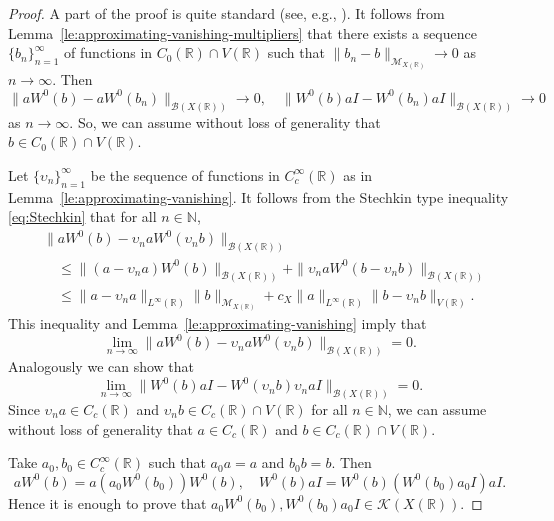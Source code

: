 \documentclass[reqno]{amsproc}
\newcommand{\cB}{\mathcal{B}}
\newcommand{\cM}{\mathcal{M}}
\newcommand{\N}{\mathbb{N}}
\newcommand{\R}{\mathbb{R}}
\theoremstyle{definition}
\theoremstyle{remark}
\numberwithin{equation}{section}
\begin{document}
\begin{proof}
A part of the proof is quite standard (see, e.g., 
\cite[Theorem 5.3.1(i)]{RSS11}).
It follows from Lemma~\ref{le:approximating-vanishing-multipliers} that there 
exists a sequence $\{b_n\}_{n=1}^\infty$ of functions in $C_0(\R)\cap V(\R)$
such that $\|b_n-b\|_{\cM_{X(\R)}}\to 0$ as $n\to\infty$. Then
\[
\|aW^0(b)-aW^0(b_n)\|_{\cB(X(\R))}\to 0,
\quad
\|W^0(b)aI-W^0(b_n)aI\|_{\cB(X(\R))}\to 0
\]
as $n\to\infty$. So, we can assume without loss of generality that 
$b\in C_0(\R)\cap V(\R)$.

Let $\{\upsilon_n\}_{n=1}^\infty$ be the sequence of functions 
in $C_c^\infty(\R)$ as in Lemma~\ref{le:approximating-vanishing}. It
follows from the Stechkin type inequality \eqref{eq:Stechkin} that for all 
$n\in\N$,
\begin{align*}
&
\|aW^0(b)-\upsilon_n aW^0(\upsilon_n b)\|_{\cB(X(\R))}
\\
&\quad
\le 
\|(a-\upsilon_n a)W^0(b)\|_{\cB(X(\R))}
+
\|\upsilon_n a W^0(b-\upsilon_n b)\|_{\cB(X(\R))}
\\
&\quad
\le 
\|a-\upsilon_n a\|_{L^\infty(\R)}\|b\|_{\cM_{X(\R)}}
+ 
c_X\|a\|_{L^\infty(\R)}\|b-\upsilon_n b\|_{V(\R)}.
\end{align*}
This inequality and Lemma~\ref{le:approximating-vanishing} imply that
\[
\lim_{n\to\infty}\|aW^0(b)-\upsilon_n aW^0(\upsilon_n b)\|_{\cB(X(\R))}=0.
\]
Analogously we can show that
\[
\lim_{n\to\infty}\|W^0(b)aI-W^0(\upsilon_n b)\upsilon_n a I\|_{\cB(X(\R))}=0.
\]
Since $\upsilon_n a\in C_c(\R)$ and $\upsilon_n b\in C_c(\R)\cap V(\R)$
for all $n\in\N$, we can assume without loss of generality that 
$a\in C_c(\R)$ and $b\in C_c(\R)\cap V(\R)$.

Take $a_0, b_0 \in C_c^\infty(\mathbb{R})$ such that $a_0 a = a$ and 
$b_0 b = b$. Then 
\[
aW^0(b) = a(a_0W^0(b_0))W^0(b) , \quad W^0(b)aI  = W^0(b)(W^0(b_0)a_0I )aI .
\]
Hence it is enough to prove that 
$a_0W^0(b_0), W^0(b_0)a_0I \in \mathcal{K}(X(\mathbb{R}))$.


\end{proof}
\end{document}
